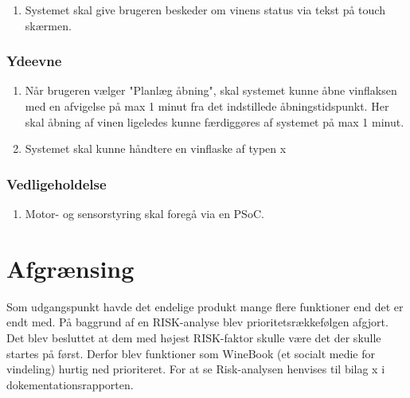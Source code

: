 \documentclass[a4paper, 11pt, oneside]{AuProjectHandin}
\begin{document}
\begin{enumerate}
\item Systemet skal give brugeren beskeder om vinens status via tekst på touch skærmen.
\end{enumerate}

\subsection{Ydeevne}
\begin{enumerate}
\item Når brugeren vælger "Planlæg åbning", skal systemet kunne åbne vinflaksen med en afvigelse på max 1 minut fra det indstillede åbningstidspunkt. Her skal åbning af vinen ligeledes kunne færdiggøres af systemet på max 1 minut.
\item Systemet skal kunne håndtere en vinflaske af typen x
\end{enumerate}

\subsection{Vedligeholdelse}
\begin{enumerate}
\item Motor- og sensorstyring skal foregå via en PSoC.
\end{enumerate}

\chapter{Afgrænsing}
Som udgangspunkt havde det endelige produkt mange flere funktioner end det er endt med. På baggrund af en RISK-analyse blev prioritetsrækkefølgen afgjort. Det blev besluttet at dem med højest RISK-faktor skulle være det der skulle startes på først. Derfor blev funktioner som WineBook (et socialt medie for vindeling) hurtig ned prioriteret. For at se Risk-analysen henvises til bilag x i dokementationsrapporten.
\end{document}
